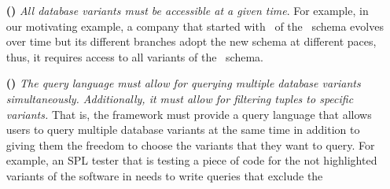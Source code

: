 %
\begin{enumerate}
\item [\textbf{(\nZero)}]
\emph{All database variants must be accessible at a given time}.
For example, in our motivating example, a company that started with 
\vOne\ of the \basic\ schema evolves over time but its different 
branches adopt the new schema at different paces, thus, it 
requires access to all variants of the \basic\ schema. 
%
%
%
\item [\textbf{(\nOne)}]
\emph{The query language must allow for querying
multiple database variants simultaneously.
Additionally, it must allow for filtering tuples to specific variants.}
That is, the framework must provide a query language that allows users to query multiple
database variants at the same time in addition to giving them the freedom to choose
the variants that they want to query. 
For example, an SPL tester that is testing a piece of code for the not highlighted 
variants of the software in  needs to write queries that exclude the 

\end{enumerate}
